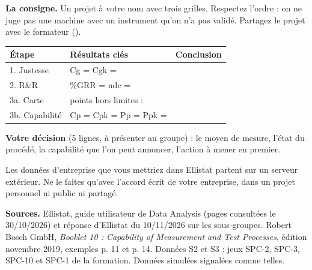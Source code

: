 \documentclass[10pt,a4paper]{article}
\begin{document}
\textbf{La consigne.} Un projet à votre nom avec trois grilles. Respectez l'ordre : on ne juge pas une machine avec un instrument qu'on n'a pas validé. Partagez le projet avec le formateur ().

\renewcommand{\arraystretch}{1.5}
\begin{tabularx}{\linewidth}{|l|X|X|}\hline
\textbf{Étape} & \textbf{Résultats clés} & \textbf{Conclusion}\\\hline
1. Justesse & Cg = \hspace{14mm} Cgk = & \\\hline
2. R\&R & \%GRR = \hspace{9mm} ndc = & \\\hline
3a. Carte & points hors limites : & \\\hline
3b. Capabilité & Cp = \hspace{6mm} Cpk = \hspace{6mm} Pp = \hspace{6mm} Ppk = & \\\hline
\end{tabularx}

\textbf{Votre décision} (5 lignes, à présenter au groupe) : le moyen de mesure, l'état du procédé, la capabilité que l'on peut annoncer, l'action à mener en premier.\reponse[5]

\begin{tcolorbox}[piege]
Les données d'entreprise que vous mettriez dans Ellistat partent sur un serveur extérieur. Ne le faites qu'avec l'accord écrit de votre entreprise, dans un projet personnel ni public ni partagé.
\end{tcolorbox}

\vfill
{\footnotesize\color{uimm}\textbf{Sources.} Ellistat, guide utilisateur de Data Analysis (pages consultées le 30/10/2026) et réponse d'Ellistat du 10/11/2026 sur les sous-groupes. Robert Bosch GmbH, \emph{Booklet 10 : Capability of Measurement and Test Processes}, édition novembre 2019, exemples p. 11 et p. 14. Données S2 et S3 : jeux SPC-2, SPC-3, SPC-10 et SPC-1 de la formation. Données simulées signalées comme telles.}
\end{document}
